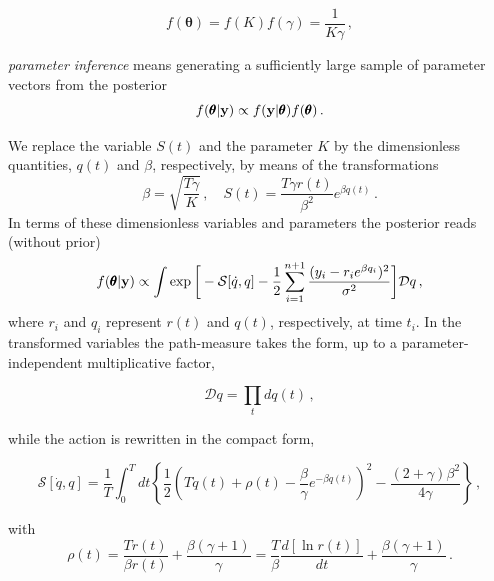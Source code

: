 \documentclass[11pt, a4paper]{article}
\newcommand{\vc}[1]{{\bf #1 }}
\newcommand{\bt}{\pmb\theta}
\newcommand{\dt}{\mathit{dt}}
\begin{document}
\begin{equation}\label{prior}
  f(\bt)
  =  f(K) f(\gamma) = \frac{1}{K \gamma} \,,
\end{equation}

{\em parameter inference} means generating a sufficiently large sample of parameter vectors from the posterior
\begin{equation}\label{posterior}
  f(\bt|\vc y)\propto f(\vc y|\bt)f(\bt)\,.
\end{equation}

We replace the variable $S(t)$ and the parameter $K$ by the dimensionless quantities, $q(t)$ and $\beta$, respectively, by means of the transformations
\begin{equation}
  \beta=\sqrt{\frac{T\gamma}{K}}\,,\quad
  S(t)=\frac{T\gamma r(t)}{\beta^2}e^{\beta q(t)}\,.
\end{equation}
In terms of these dimensionless variables and parameters the posterior reads (without prior)
\begin{equation}\label{posterior_pathint}
  f(\bt | \vc y)
  \propto
  \int
  \exp\bigg[
    -{{\mathcal S}}[\dot{q},q]
    -\frac{1}{2}
    \sum_{i=1}^{n+1}
    \frac
    {(y_i-r_ie^{\beta q_i})^2}
    {\sigma^2}
  \bigg]
  {\mathcal Dq}
  \,,
\end{equation}
where $r_i$ and $q_i$ represent $r(t)$ and $q(t)$, respectively, at time $t_i$. In the transformed variables the path-measure takes the form, up to a parameter-independent multiplicative factor,

\begin{equation}\label{pathmeasure_q}
{\mathcal Dq}
=
\prod_{t}
dq(t)\,,
\end{equation}

while the action is rewritten in the compact form,

\begin{equation}\label{action_new}
{\mathcal S}[\dot{q},q]
=
\frac{1}{T}
\int_0^T \dt \left\{
\frac{1}{2}
\left(
    T\dot q(t)
    +
    \rho(t)
    -
    \frac{\beta}{\gamma}e^{-\beta q(t)}\right)^2
    -
    \frac{(2+\gamma)\beta^2}{4\gamma}
\right\} \,,
\end{equation}

with
\begin{equation}\label{rho}
\rho(t)=\frac{T\dot r(t)}{\beta r(t)}+\frac{\beta(\gamma+1)}{\gamma}
=
\frac{T}{\beta}\frac{d \left[\ln r(t)\right]}{dt}+\frac{\beta(\gamma+1)}{\gamma}\,.
\end{equation}
\end{document}
